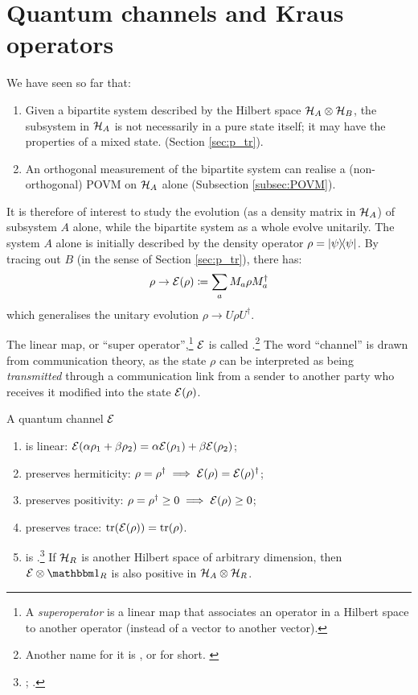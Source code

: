 \section{Quantum channels and Kraus operators}

We have seen so far that:
\begin{enumerate}
\item
  Given a bipartite system
  described by the Hilbert space
  $\mathcal{H}_A\otimes\mathcal{H}_B$,
  the subsystem in $\mathcal{H}_A$
  is not necessarily in a pure state itself; it
  may have the properties of a mixed state.
  (Section \ref{sec:p_tr}).
\item
  An orthogonal measurement of the bipartite system can realise a
  (non-orthogonal) POVM on $\mathcal{H}_A$ alone (Subsection \ref{subsec:POVM}).
\end{enumerate}

It is therefore of interest to study
the evolution (as a density matrix in $\mathcal{H}_A$) of subsystem $A$ alone,
while the bipartite system as a whole evolve unitarily.
The system $A$ alone
is initially described by the density operator $\rho=\ketbra{\psi}$.
By tracing out
$B$
(in the sense of Section \ref{sec:p_tr}),
there has:
\begin{equation}\label{eq:channel}
  \rho \rightarrow \mathcal{E}(\rho) \coloneqq \sum_a M_a \rho M_a^{\dagger}
\end{equation}
which generalises the unitary evolution $\rho \rightarrow U \rho U^{\dagger}$.

The linear map, or ``super operator'',\footnote{
  A \emph{superoperator} is a linear map that associates an operator
  in a Hilbert space to another operator (instead of a vector to another vector).
}
$\mathcal{E}$
is called .\footnote{
  Another name for it is
  ,
  or  for short. \parencite[sec.3.2]{PreskillNotes}
}
The word ``channel'' is drawn from communication theory,
as the state $\rho$ can be interpreted as being \emph{transmitted}
through
a communication link from a sender to another party
who receives it modified into the state $\mathcal{E}(\rho)$.

A quantum channel $\mathcal{E}$
\begin{enumerate}
  \item is linear:
    $\mathcal{E}(\alpha\rho_1+\beta\rho_2) = \alpha\mathcal{E}(\rho_1) + \beta\mathcal{E}(\rho_2)$;
  \item preserves hermiticity:
    $\rho = \rho^{\dagger} \implies \mathcal{E}(\rho) = \mathcal{E}(\rho)^{\dagger}$;
  \item preserves positivity:
    $\rho = \rho^{\dagger} \geq 0 \implies \mathcal{E}(\rho) \geq 0$;
  \item preserves trace:
    $\tr(\mathcal{E}(\rho)) = \tr(\rho)$.
  \item is .\footnote{\citereset
      \cite[sec. 3.2.6]{PreskillNotes}; \cite[sec. 8.2.4]{NielsenChuang}.
    } If $\mathcal{H}_R$
    is another Hilbert space of arbitrary dimension,
    then $\superop{E} \ox \idop_{R}$ is also positive
    in $\mathcal{H}_A \otimes \mathcal{H}_R$.
\end{enumerate}

